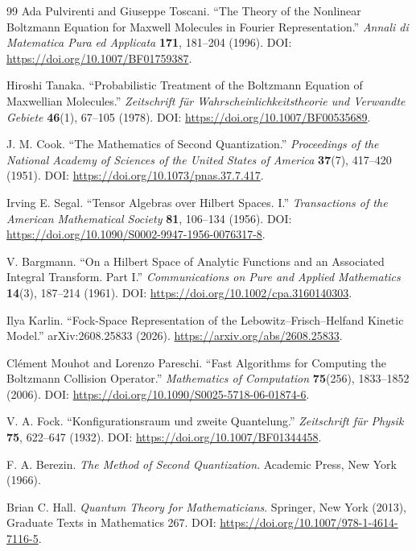 \documentclass[11pt,oneside]{article}
\numberwithin{equation}{section}
\theoremstyle{definition}
\begin{document}
\begin{thebibliography}{99}
Ada Pulvirenti and Giuseppe Toscani. ``The Theory of the Nonlinear Boltzmann Equation for Maxwell Molecules in Fourier Representation.'' \emph{Annali di Matematica Pura ed Applicata} \textbf{171}, 181--204 (1996). DOI: \url{https://doi.org/10.1007/BF01759387}.

Hiroshi Tanaka. ``Probabilistic Treatment of the Boltzmann Equation of Maxwellian Molecules.'' \emph{Zeitschrift f{\"u}r Wahrscheinlichkeitstheorie und Verwandte Gebiete} \textbf{46}(1), 67--105 (1978). DOI: \url{https://doi.org/10.1007/BF00535689}.

J. M. Cook. ``The Mathematics of Second Quantization.'' \emph{Proceedings of the National Academy of Sciences of the United States of America} \textbf{37}(7), 417--420 (1951). DOI: \url{https://doi.org/10.1073/pnas.37.7.417}.

Irving E. Segal. ``Tensor Algebras over Hilbert Spaces. I.'' \emph{Transactions of the American Mathematical Society} \textbf{81}, 106--134 (1956). DOI: \url{https://doi.org/10.1090/S0002-9947-1956-0076317-8}.

V. Bargmann. ``On a Hilbert Space of Analytic Functions and an Associated Integral Transform. Part I.'' \emph{Communications on Pure and Applied Mathematics} \textbf{14}(3), 187--214 (1961). DOI: \url{https://doi.org/10.1002/cpa.3160140303}.

Ilya Karlin. ``Fock-Space Representation of the Lebowitz--Frisch--Helfand Kinetic Model.'' arXiv:2608.25833 (2026). \url{https://arxiv.org/abs/2608.25833}.

Cl{\'e}ment Mouhot and Lorenzo Pareschi. ``Fast Algorithms for Computing the Boltzmann Collision Operator.'' \emph{Mathematics of Computation} \textbf{75}(256), 1833--1852 (2006). DOI: \url{https://doi.org/10.1090/S0025-5718-06-01874-6}.

V. A. Fock. ``Konfigurationsraum und zweite Quantelung.'' \emph{Zeitschrift f{\"u}r Physik} \textbf{75}, 622--647 (1932). DOI: \url{https://doi.org/10.1007/BF01344458}.

F. A. Berezin. \emph{The Method of Second Quantization}. Academic Press, New York (1966).

Brian C. Hall. \emph{Quantum Theory for Mathematicians}. Springer, New York (2013), Graduate Texts in Mathematics 267. DOI: \url{https://doi.org/10.1007/978-1-4614-7116-5}.

\end{thebibliography}
\end{document}
